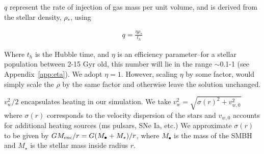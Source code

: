 \documentclass[usenatbib,fleqn]{mn2e}
\newcommand{\vw}{v_w}
\newcommand{\Menc}{M_{\rm enc}}
\newcommand{\Mstar}{M_{\star}}
\newcommand{\Mbh}[1][]{M_{\bullet#1}}
\begin{document}
$q$ represent the rate of injection of gas mass per unit volume, and is derived from the stellar density, $\rho_*$, using

\begin{align}
q=\frac{\eta \rho_*}{t_h}
\end{align}

Where $t_h$ is the Hubble time, and $\eta$ is an efficiency parameter--for a stellar population between 2-15 Gyr old, this number will lie in the range $\sim$0.1-1 (see Appendix~\ref{app:eta}). We adopt $\eta=1$. However, scaling $\eta$ by some factor, would simply scale the $\rho$ by the same factor and otherwise leave the solution unchanged. 

$\vw^2/2$ encapsulates heating in our simulation. We take $\vw^2=\sqrt{\sigma(r)^2+v_{w,0}^2}$ where $\sigma(r)$ corresponds to the velocity dispersion of the stars and $v_{w,0}$ accounts for additional heating sources (ms pulsars, SNe Ia, etc.)  We approximate $\sigma(r)$ to be given by $G \Menc/r=G(\Mbh+\Mstar)/r$, where $\Mbh$ is the mass of the SMBH and $\Mstar$ is the stellar mass inside radius $r$. 

\end{document}
